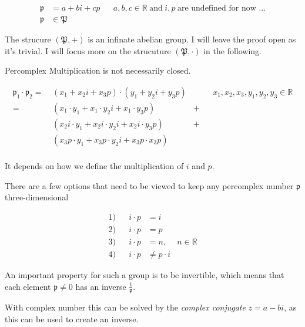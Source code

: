 \documentclass[a4paper,english,parskip]{scrartcl}
\begin{document}
\begin{tcolorbox}[title=Percomplex Numbers,colframe=blue!60, colback=blue!5]
\begin{align*}
\mathfrak{p} &= a + bi + cp && a,b,c \in \mathbb{R} \hspace{3pt} \text{and} \hspace{3pt} i,p \hspace{3pt} \text{are undefined for now ...} \\
\mathfrak{p} &\in \mathfrak{P} 
\end{align*}
\end{tcolorbox}

The strucure $(\mathfrak{P}, +)$ is an infinate abelian group.
I will leave the proof open as it's trivial.
I will focus more on the strucuture $(\mathfrak{P}, \cdot)$ in the following.

Percomplex Multiplication is not necessarily closed.

\begin{align*}
\mathfrak{p}_1 \cdot \mathfrak{p}_2 = \hspace{3pt} & (x_1 + x_2i +x_3p) \cdot (y_1 + y_2i + y_3p)
&&& x_1,x_2,x_3, y_1,y_2,y_3 \in \mathbb{R} \\
= \hspace{3pt} & (x_1 \cdot y_1 + x_1 \cdot y_2i + x_1 \cdot y_3p) &+ \\
& (x_2i \cdot y_1 + x_2i \cdot y_2i + x_2i \cdot y_3p) &+ \\
& (x_3p \cdot y_1 + x_3p \cdot y_2i + x_3p \cdot x_3p)  \\
\end{align*}

It depends on how we define the multiplication of $i$ and $p$.

There are a few options that need to be viewed to keep any percomplex number $\mathfrak{p}$ three-dimensional

\begin{align*}
1) && i \cdot p &= i \\
2) && i \cdot p &= p \\
3) && i \cdot p &= n, & n \in \mathbb{R} \\
4) && i \cdot p &\neq p \cdot i
\end{align*}


An important property for such a group is to be invertible, which means
that each element $\mathfrak{p} \neq 0$ has an inverse $\frac{1}{\mathfrak{p}}$.

With complex number this can be solved by the \textit{complex conjugate} $\overline{z} = a - bi$,
as this can be used to create an inverse.
\end{document}
